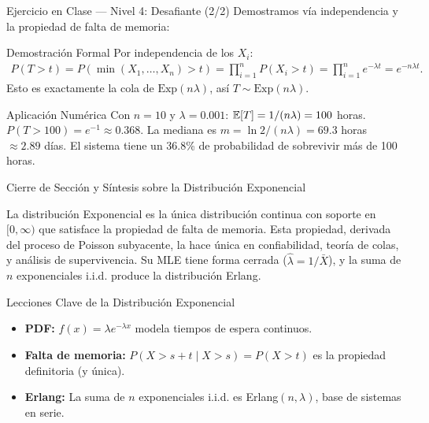 \documentclass[10pt, aspectratio=169]{beamer}
\begin{document}
\begin{frame}{Ejercicio en Clase --- Nivel 4: Desafiante (2/2)}
  \scriptsize
  Demostramos vía independencia y la propiedad de falta de memoria: \pause

  \vspace{0.05cm}
  \begin{block}{Demostración Formal}
    \scriptsize
    Por independencia de los $X_{i}$:
    \begin{align*}
      P(T > t) = P(\min(X_{1}, \dots, X_{n}) > t) = \prod_{i=1}^{n} P(X_{i} > t) = \prod_{i=1}^{n} e^{-\lambda t} = e^{-n\lambda t}.
    \end{align*}
    Esto es exactamente la cola de $\text{Exp}(n\lambda)$, así $T \sim \text{Exp}(n\lambda)$. \quad \qedhere
  \end{block}

  \vspace{0.05cm}
  \pause
  \begin{alertblock}{Aplicación Numérica}
    \scriptsize
    Con $n = 10$ y $\lambda = 0.001$: $\mathbb{E}[T] = 1/(n\lambda) = 100$ horas. $P(T > 100) = e^{-1} \approx 0.368$. La mediana es $m = \ln 2/(n\lambda) = 69.3$ horas $\approx 2.89$ días. El sistema tiene un 36.8\% de probabilidad de sobrevivir más de 100 horas.
  \end{alertblock}
\end{frame}

\begin{frame}{Cierre de Sección y Síntesis sobre la Distribución Exponencial}
  \begin{reflexion}
    La distribución Exponencial es la única distribución continua con soporte en $[0, \infty)$ que satisface la propiedad de falta de memoria. Esta propiedad, derivada del proceso de Poisson subyacente, la hace única en confiabilidad, teoría de colas, y análisis de supervivencia. Su MLE tiene forma cerrada ($\hat{\lambda} = 1/\bar{X}$), y la suma de $n$ exponenciales i.i.d. produce la distribución Erlang.
  \end{reflexion}

  \vspace{0.2cm}
  \pause
  \begin{block}{Lecciones Clave de la Distribución Exponencial}
    \begin{itemize}\itemsep=0.08cm
      \item \textbf{PDF:} $f(x) = \lambda e^{-\lambda x}$ modela tiempos de espera continuos.
      \item \textbf{Falta de memoria:} $P(X > s + t \mid X > s) = P(X > t)$ es la propiedad definitoria (y única).
      \item \textbf{Erlang:} La suma de $n$ exponenciales i.i.d. es Erlang$(n, \lambda)$, base de sistemas en serie.
    \end{itemize}
  \end{block}
\end{frame}
\end{document}
